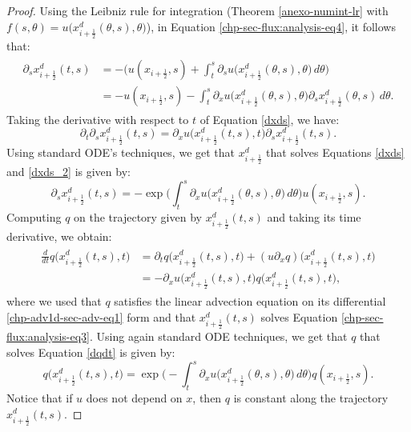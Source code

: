 \begin{proof}
Using the Leibniz rule for integration (Theorem \ref{anexo-numint-lr} with 
$f(s,\theta) = u\big(x^d_{i+\frac{1}{2}}(\theta,s),\theta\big)$),
in Equation \eqref{chp-sec-flux:analysis-eq4}, it follows that:
	\begin{align}
		\begin{split}
			\label{dxds}
			{\partial_s x_{i+\frac{1}{2}}^d} (t,s) &= - \bigg({u}(x_{i+\frac{1}{2}},s) + 
			\int_{t}^{s} {\partial_s}{{u}}\big( x_{i+\frac{1}{2}}^d(\theta,s),\theta\big) \,d\theta \bigg)\\
			&=- {u}(x_{i+\frac{1}{2}},s) -
			\int_{t}^{s} {\partial_x}{{u}}\big( x_{i+\frac{1}{2}}^d(\theta, s),\theta\big) 
			{\partial_s  x_{i+\frac{1}{2}}^d}(\theta, s)\,d\theta.
		\end{split}
	\end{align}
	Taking the derivative with respect to $t$ of Equation \eqref{dxds}, we have:
	\begin{equation}
			\label{dxds_2}
			{\partial_t }{\partial_s  x_{i+\frac{1}{2}}^d}
			(t,s) = {\partial_x}{{u}}\big(x_{i+\frac{1}{2}}^d(t, s), t\big) 
			{\partial _s} x_{i+\frac{1}{2}}^d (t, s).
	\end{equation}
	Using standard ODE's techniques, 
	we get that $ x_{i+\frac{1}{2}}^d$ that solves Equations \eqref{dxds} and \eqref{dxds_2}
	is given by:
	\begin{equation}
			\label{xs_int}
			{\partial_s  x_{i+\frac{1}{2}}^d}(t,s) = -
			\exp{\bigg(\int_{t}^{s} {\partial_x}{{u}}\big( x_{i+\frac{1}{2}}^d(\theta,s),\theta\big)  \,d\theta \bigg)}
			{u}(x_{i+\frac{1}{2}},s).
	\end{equation}
	Computing $q$ on the trajectory given by $x_{i+\frac{1}{2}}^d(t,s)$ and taking
	its time derivative, we obtain:
	\begin{align}
		\label{dqdt}
		\begin{split}
			\frac{d}{dt}q\big( x_{i+\frac{1}{2}}^d(t,s),t\big) &= 
			{\partial_t}q\big( x_{i+\frac{1}{2}}^d(t,s),t\big)+
			({u}{\partial_x } 
			q)\big(x_{i+\frac{1}{2}}^d(t,s),t\big) \\
			&= -{\partial_x}{{u}}\big( x_{i+\frac{1}{2}}^d(t,s),t\big) q \big(x_{i+\frac{1}{2}}^d(t,s),t\big),
		\end{split}
	\end{align}
	where we used that $q$ satisfies the linear advection equation on its differential \eqref{chp-adv1d-sec-adv-eq1} form
   and that $x_{i+\frac{1}{2}}^d(t,s)$ solves Equation \eqref{chp-sec-flux:analysis-eq3}.
	Using again standard ODE techniques, we get that $q$ that solves Equation \eqref{dqdt}
	is given by:
	\begin{equation}
			\label{q_int}
			 q\big( x_{i+\frac{1}{2}}^d(t,s),t\big) = 
			\exp{\bigg(-\int_{t}^{s} {\partial_x}{{u}}\big( x_{i+\frac{1}{2}}^d(\theta,s),\theta\big)  \,d\theta \bigg)}
			 q(x_{i+\frac{1}{2}},s).
	\end{equation}
	Notice that if ${u}$ does not depend on $x$, then $q$ is constant along the trajectory $ x_{i+\frac{1}{2}}^d(t,s)$.
	

\end{proof}

